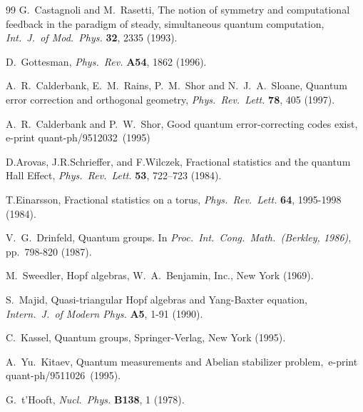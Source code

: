 \documentclass[12pt]{article}
\begin{document}
\begin{thebibliography}{99}
 G.~Castagnoli and M.~Rasetti, The notion of symmetry and 
computational feedback in the paradigm of steady, simultaneous quantum
computation, \textit{Int.\ J.\ of Mod.\ Phys.} \textbf{32}, 2335 (1993).

 D.~Gottesman, \textit{Phys.\ Rev.} \textbf{A54}, 1862 (1996).

 A.~R.~Calderbank, E.~M.~Rains, P.~M.~Shor and N.~J.~A.~Sloane,
Quantum error correction and orthogonal geometry, \textit{Phys.\ Rev.\ Lett.}
\textbf{78}, 405 (1997).

  A.~R.~Calderbank and P.~W.~Shor, Good quantum 
error-cor\-rect\-ing codes exist,\, e-print quant-ph/9512032\, (1995)

 D.Arovas, J.R.Schrieffer, and F.Wilczek, Fractional statistics
and the quantum Hall Effect, \textit{Phys.\ Rev.\ Lett.} \textbf{53}, 722--723
(1984).

  T.Einarsson, Fractional statistics on a torus, 
\textit{Phys.\ Rev.\ Lett.} \textbf{64}, 1995-1998 (1984).

 V.~G.~Drinfeld, Quantum groups. In \textit{Proc.\ Int.\ Cong.\
Math.\ (Berkley, 1986)}, pp.~798-820 (1987).

 M.~Sweedler, Hopf algebras, W.~A.~Benjamin, Inc., New York (1969).

 S.~Majid, Quasi-triangular Hopf algebras and Yang-Baxter
equation, \textit{Intern.\ J.\ of Modern Phys.} \textbf{A5}, 1-91
(1990).

 C.~Kassel, Quantum groups, Springer-Verlag, New York (1995).

 A.~Yu.~Kitaev, Quantum measurements and Abelian stabilizer
problem,\, e-print quant-ph/9511026\, (1995).

 G.~t'Hooft, \textit{Nucl.\ Phys.} \textbf{B138}, 1 (1978).

\end{thebibliography}
\end{document}
